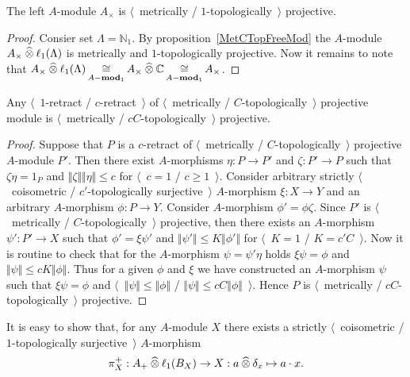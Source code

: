 \begin{proposition}\label{UnitalAlgIsMetTopProj} The left $A$-module $A_\times$
is $\langle$~metrically / $1$-topologically~$\rangle$ projective.
\end{proposition} 
\begin{proof} Consier set $\Lambda=\mathbb{N}_1$. 
By proposition~\ref{MetCTopFreeMod} the 
$A$-module $A_\times\mathbin{\widehat{\otimes}}\ell_1(\Lambda)$ is metrically 
and $1$-topologically projective. Now it remains to note that 
$A_\times\mathbin{\widehat{\otimes}}\ell_1(\Lambda)
\mathop{\mathbin{\cong}}\limits_{A-\mathbf{mod}_1}
A_\times\mathbin{\widehat{\otimes}} \mathbb{C}
\mathop{\mathbin{\cong}}\limits_{A-\mathbf{mod}_1}
A_\times$.
\end{proof}

\begin{proposition}\label{RetrMetCTopProjIsMetCTopProj} Any 
$\langle$~$1$-retract / $c$-retract~$\rangle$ of
$\langle$~metrically / $C$-topologically~$\rangle$ projective module is
$\langle$~metrically / $c C$-topologically~$\rangle$ projective.
\end{proposition}
\begin{proof} Suppose that $P$ is a $c$-retract of 
$\langle$~metrically / $C$-topologically~$\rangle$ projective $A$-module $P'$.
Then there exist $A$-morphisms $\eta:P\to P'$ and $\zeta: P'\to P$ such that
$\zeta\eta=1_{P}$ and $\Vert\zeta\Vert\Vert\eta\Vert\leq c$ 
for $\langle$~$c=1$ / $c\geq 1$~$\rangle$. Consider arbitrary
strictly $\langle$~coisometric / $c'$-topologically surjective~$\rangle$ 
$A$-morphism $\xi:X\to Y$ and an arbitrary $A$-morphism $\phi:P\to Y$. 
Consider $A$-morphism $\phi'=\phi\zeta$. Since $P'$ is 
$\langle$~metrically / $C$-topologically~$\rangle$ projective, then there 
exists an $A$-morphism $\psi':P'\to X$ such that $\phi'=\xi\psi'$ 
and $\Vert\psi'\Vert \leq K\Vert\phi'\Vert$ 
for $\langle$~$K=1$ / $K=c' C$~$\rangle$. Now it is routine to check that 
for the $A$-morphism $\psi=\psi'\eta$ 
holds $\xi\psi=\phi$ and $\Vert\psi\Vert \leq cK\Vert\phi\Vert$. 
Thus for a given $\phi$ and $\xi$ we have
constructed an $A$-morphism $\psi$ such that $\xi\psi=\phi$  and
$\langle$~$\Vert\psi\Vert\leq\Vert\phi\Vert$ / 
$\Vert \psi\Vert\leq c C\Vert\phi\Vert$~$\rangle$. Hence $P$ 
is $\langle$~metrically / $c C$-topologically~$\rangle$ projective.
\end{proof}

It is easy to show that, for any $A$-module $X$ there exists 
a strictly $\langle$~coisometric / $1$-topologically surjective~$\rangle$ 
$A$-morphism
$$
\pi_X^+:A_+\mathbin{\widehat{\otimes}} \ell_1(B_X)\to X:a\mathbin{\widehat{\otimes}} \delta_x\mapsto a\cdot x.
$$

